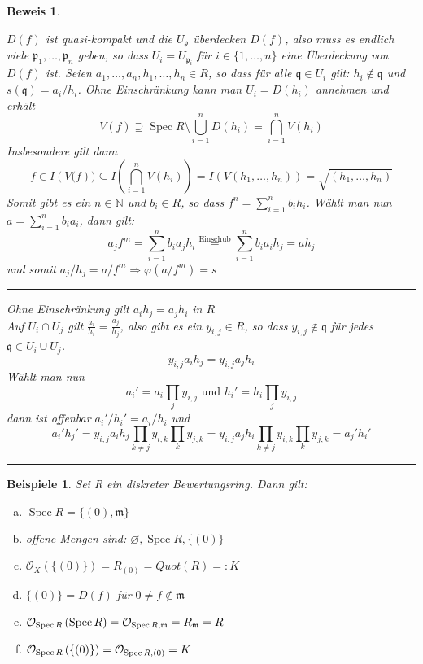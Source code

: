 \documentclass[a4paper,oneside]{scrbook}
\theoremstyle{break}
\newtheorem{Bsp}[Def]{Beispiele}
\theoremstyle{nonumberbreak}
\theoremstyle{nonumberplain}
\newtheorem{Bew}{Beweis}
\theoremstyle{break}
\renewcommand{\emptyset}{%
	\ensuremath{\varnothing}%
}
\newcommand{\NN}{%
	\ensuremath{\mathbb{N}}%
}
\renewcommand{\phi}{%
	\ensuremath{\varphi}%
}
\newcommand{\Spec}{%
	\ensuremath{\operatorname{Spec}}%
}
\newcommand{\rad}[1]{%
	\ensuremath{\sqrt{#1}}%
}
\begin{document}
\begin{Bew}
\begin{enumerate}[(a)]
				$D\left(f\right)$ ist quasi-kompakt und die $U_{\mathfrak{p}}$ überdecken $D(f)$, also muss es endlich viele 
				$\mathfrak{p}_1,\dots,\mathfrak{p}_n$ geben, so dass $U_i = U_{\mathfrak{p}_i}$ für $i \in \{1,\dots,n\}$
				eine Überdeckung von $D(f)$ ist.
				Seien $a_1,\dots,a_n,h_1,\dots,h_n \in R$, so dass für alle $\mathfrak{q} \in U_i$ gilt:
				$h_i \notin \mathfrak{q}$ und $s\left(\mathfrak{q}\right) = a_i/h_i$.
				Ohne Einschränkung kann man $U_i = D\left(h_i\right)$ annehmen und erhält
				\[
					V\left(f\right) \supseteq \Spec R \setminus \bigcup_{i = 1}^{n} D(h_i) = \bigcap_{i = 1}^{n} V(h_i)
				\]
				Insbesondere gilt dann
				\[
					f \in I\left(V(f\right) ) \subseteq I\left( \bigcap_{i = 1}^{n} V(h_i) \right) 
						= I(V( h_1,\dots,h_n ) ) = \rad{ (h_1,\dots,h_n) }
				\]
				Somit gibt es ein $n \in \NN$ und $b_i \in R$, so dass $f^n = \sum_{i = 1}^{n} b_i h_i$.
				Wählt man nun $a = \sum_{i=1}^{n} b_i a_i$, dann gilt:
				\[
					a_j f^m = \sum_{i=1}^{n} b_i a_j h_i \overset{\text{Einschub}}{=} \sum_{i=1}^{n} b_i a_i h_j = a h_j
				\]
				und somit $a_j/h_j = a/f^m \Longrightarrow \phi\left( a/f^m \right) = s$
{
	\medskip\hrule
				{ \small
				Ohne Einschränkung gilt $ a_i h_j = a_j h_i$ in $R$ \\
				Auf $U_i \cap U_j$ gilt $\frac{a_i}{h_i} = \frac{a_j}{h_j}$, also gibt es ein $y_{i,j} \in R$, so dass
					$y_{i,j} \notin \mathfrak{q}$ für jedes $\mathfrak{q} \in U_i \cup U_j$.
				\[
					y_{i,j} a_i h_j = y_{i,j} a_j h_i
				\]
				Wählt man nun 
				\[
					a_i' = a_i\prod_{j} y_{i,j} \text{ und }h_i' = h_i \prod_{j} y_{i,j}
				\]
				dann ist offenbar $a_i'/h_i' = a_i/h_i$ und
				\[
					a_i' h_j'	= y_{i,j} a_i h_j \prod_{ k \neq j} y_{i,k} \prod_{k } y_{j,k} 
								= y_{i,j} a_j h_i \prod_{ k \neq j} y_{i,k} \prod_{k } y_{j,k} 
								= a_j' h_i'
				\]
				}
	\hrule \medskip
}
	\end{enumerate}
\end{Bew}

\begin{Bsp}
 Sei R ein diskreter Bewertungsring. Dann gilt:
	\begin{enumerate}[(a)]
		\item $\Spec R = \{(0), \mathfrak m\}$
		\item offene Mengen sind: $\emptyset, \Spec R, \{(0)\}$
		\item $\mathcal{O}_{X}\left( \{(0)\} \right) = R_{(0)}=Quot(R)=:K$
		\item $\{(0)\}=D(f)$ für $0 \neq f \notin \mathfrak m$
		\item $\mathcal{O}_{\Spec R}\left( \Spec R \right)= \mathcal{O}_{\Spec R,\mathfrak m}=R_\mathfrak{m} = R$
		\item $\mathcal{O}_{\Spec R}\left( \{(0)\}\right)= \mathcal{O}_{\Spec R,(0)}=K$
	\end{enumerate}
\end{Bsp}
\end{document}

